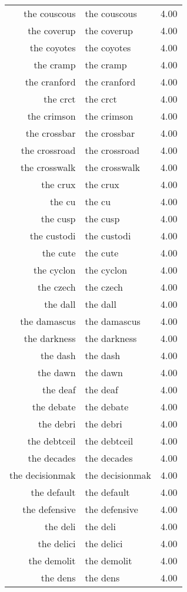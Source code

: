 \begin{table}[ht]
\begin{tabular}{rlr}
  the couscous & the couscous & 4.00 \\ 
  the coverup & the coverup & 4.00 \\ 
  the coyotes & the coyotes & 4.00 \\ 
  the cramp & the cramp & 4.00 \\ 
  the cranford & the cranford & 4.00 \\ 
  the crct & the crct & 4.00 \\ 
  the crimson & the crimson & 4.00 \\ 
  the crossbar & the crossbar & 4.00 \\ 
  the crossroad & the crossroad & 4.00 \\ 
  the crosswalk & the crosswalk & 4.00 \\ 
  the crux & the crux & 4.00 \\ 
  the cu & the cu & 4.00 \\ 
  the cusp & the cusp & 4.00 \\ 
  the custodi & the custodi & 4.00 \\ 
  the cute & the cute & 4.00 \\ 
  the cyclon & the cyclon & 4.00 \\ 
  the czech & the czech & 4.00 \\ 
  the dall & the dall & 4.00 \\ 
  the damascus & the damascus & 4.00 \\ 
  the darkness & the darkness & 4.00 \\ 
  the dash & the dash & 4.00 \\ 
  the dawn & the dawn & 4.00 \\ 
  the deaf & the deaf & 4.00 \\ 
  the debate & the debate & 4.00 \\ 
  the debri & the debri & 4.00 \\ 
  the debtceil & the debtceil & 4.00 \\ 
  the decades & the decades & 4.00 \\ 
  the decisionmak & the decisionmak & 4.00 \\ 
  the default & the default & 4.00 \\ 
  the defensive & the defensive & 4.00 \\ 
  the deli & the deli & 4.00 \\ 
  the delici & the delici & 4.00 \\ 
  the demolit & the demolit & 4.00 \\ 
  the dens & the dens & 4.00 \\ 

\end{tabular}
\end{table}
